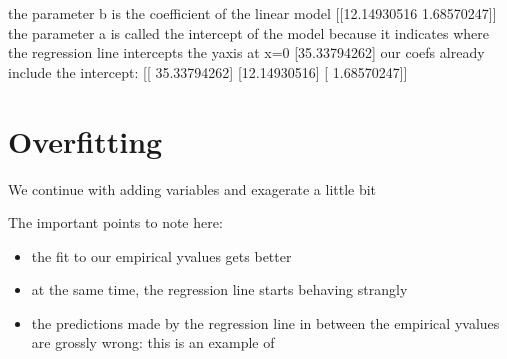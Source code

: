 \documentclass[letterpaper,10pt,english]{jupyterBook}
\begin{document}
\begin{sphinxVerbatim}[commandchars=\\\{\}]
the parameter b is the coefficient of the linear model [[\PYGZhy{}12.14930516   1.68570247]]
the parameter a is called the intercept of the model because it indicates
 where the regression line intercepts the y\PYGZhy{}axis at x=0 [35.33794262]
our coefs already include the intercept: [[ 35.33794262]
 [\PYGZhy{}12.14930516]
 [  1.68570247]]
\end{sphinxVerbatim}


\section{Overfitting}
\label{\detokenize{Regression_Techniques:overfitting}}
\sphinxAtStartPar
We continue with adding variables and exagerate a little bit

\sphinxAtStartPar
The important points to note here:
\begin{itemize}
\item {} 
\sphinxAtStartPar
the fit to our empirical y\sphinxhyphen{}values gets better

\item {} 
\sphinxAtStartPar
at the same time, the regression line starts behaving strangly

\item {} 
\sphinxAtStartPar
the predictions made by the regression line in between the empirical y\sphinxhyphen{}values are grossly wrong: this is an example of 

\end{itemize}
\end{document}

